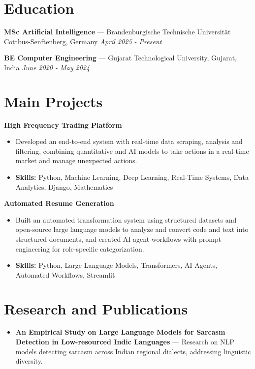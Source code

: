 \documentclass[a4paper,10pt]{article}
\begin{document}
\section*{Education}
\textbf{MSc Artificial Intelligence} — Brandenburgische Technische Universität Cottbus-Senftenberg, Germany \hfill \textit{April 2025 - Present}\par
\vspace{1.5pt}
\textbf{BE Computer Engineering} — Gujarat Technological University, Gujarat, India \hfill \textit{June 2020 - May 2024}\par

\section*{Main Projects}
\textbf{High Frequency Trading Platform}\par
\vspace{1pt}
\begin{itemize}
  \item Developed an end-to-end system with real-time data scraping, analysis and filtering, combining quantitative and AI models to take actions in a real-time market and manage unexpected actions.
  \item \textbf{Skills:} Python, Machine Learning, Deep Learning, Real-Time Systems, Data Analytics, Django, Mathematics
\end{itemize}
\vspace{3pt}
\textbf{Automated Resume Generation}\par
\vspace{1pt}
\begin{itemize}
  \item Built an automated transformation system using structured datasets and open-source large language models to analyze and convert code and text into structured documents, and created AI agent workflows with prompt engineering for role-specific categorization.
  \item \textbf{Skills:} Python, Large Language Models, Transformers, AI Agents, Automated Workflows, Streamlit
\end{itemize}

\section*{Research and Publications}
\begin{itemize}
\item \textbf{An Empirical Study on Large Language Models for Sarcasm Detection in Low-resourced Indic Languages} — Research on NLP models detecting sarcasm across Indian regional dialects, addressing linguistic diversity.
\end{itemize}
\end{document}
